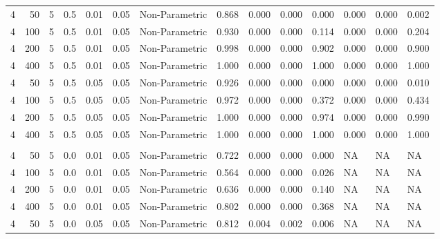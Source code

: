 \begin{table}
{{\begin{tabular}{rrrrrrllllllll}
\hspace{1em}4 & 50 & 5 & 0.5 & 0.01 & 0.05 & Non-Parametric & 0.868 & 0.000 & 0.000 & 0.000 & 0.000 & 0.000 & 0.002\\
\hspace{1em}4 & 100 & 5 & 0.5 & 0.01 & 0.05 & Non-Parametric & 0.930 & 0.000 & 0.000 & 0.114 & 0.000 & 0.000 & 0.204\\
\hspace{1em}4 & 200 & 5 & 0.5 & 0.01 & 0.05 & Non-Parametric & 0.998 & 0.000 & 0.000 & 0.902 & 0.000 & 0.000 & 0.900\\
\hspace{1em}4 & 400 & 5 & 0.5 & 0.01 & 0.05 & Non-Parametric & 1.000 & 0.000 & 0.000 & 1.000 & 0.000 & 0.000 & 1.000\\
\hspace{1em}4 & 50 & 5 & 0.5 & 0.05 & 0.05 & Non-Parametric & 0.926 & 0.000 & 0.000 & 0.000 & 0.000 & 0.000 & 0.010\\
\hspace{1em}4 & 100 & 5 & 0.5 & 0.05 & 0.05 & Non-Parametric & 0.972 & 0.000 & 0.000 & 0.372 & 0.000 & 0.000 & 0.434\\
\hspace{1em}4 & 200 & 5 & 0.5 & 0.05 & 0.05 & Non-Parametric & 1.000 & 0.000 & 0.000 & 0.974 & 0.000 & 0.000 & 0.990\\
\hspace{1em}4 & 400 & 5 & 0.5 & 0.05 & 0.05 & Non-Parametric & 1.000 & 0.000 & 0.000 & 1.000 & 0.000 & 0.000 & 1.000\\
\addlinespace[0.3em]
\multicolumn{14}{l}{\textbf{$t_3$ Distribution}}\\
\hspace{1em}4 & 50 & 5 & 0.0 & 0.01 & 0.05 & Non-Parametric & 0.722 & 0.000 & 0.000 & 0.000 & NA & NA & NA\\
\hspace{1em}4 & 100 & 5 & 0.0 & 0.01 & 0.05 & Non-Parametric & 0.564 & 0.000 & 0.000 & 0.026 & NA & NA & NA\\
\hspace{1em}4 & 200 & 5 & 0.0 & 0.01 & 0.05 & Non-Parametric & 0.636 & 0.000 & 0.000 & 0.140 & NA & NA & NA\\
\hspace{1em}4 & 400 & 5 & 0.0 & 0.01 & 0.05 & Non-Parametric & 0.802 & 0.000 & 0.000 & 0.368 & NA & NA & NA\\
\hspace{1em}4 & 50 & 5 & 0.0 & 0.05 & 0.05 & Non-Parametric & 0.812 & 0.004 & 0.002 & 0.006 & NA & NA & NA\\

\end{tabular}}}
\end{table}
